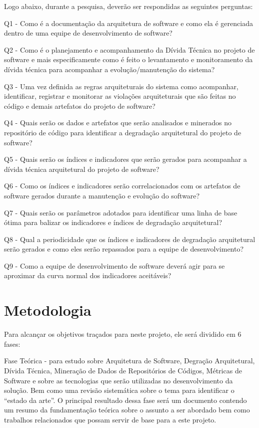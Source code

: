 \documentclass[
	12pt,				%
	openright,			%
	twoside,			%
	a4paper,			%
	english,			%
	french,				%
	spanish,			%
	brazil,				%
	]{abntex2}
\begin{document}

Logo abaixo, durante a pesquisa, deverão ser respondidas as seguintes
perguntas:

Q1 - Como é a documentação da arquitetura de software e como ela é
gerenciada dentro de uma equipe de desenvolvimento de software?

Q2 - Como é o planejamento e acompanhamento da Dívida Técnica no projeto
de software e mais especificamente como é feito o levantamento e monitoramento
da dívida técnica para acompanhar a evolução/manutenção do sistema?

Q3 - Uma vez definida as regras arquiteturais do sistema como acompanhar,
identificar, registrar e monitorar as violações arquiteturais que
são feitas no código e demais artefatos do projeto de software? 

Q4 - Quais serão os dados e artefatos que serão analisados e minerados
no repositório de código para identificar a degradação arquitetural
do projeto de software?

Q5 - Quais serão os índices e indicadores que serão gerados para acompanhar
a dívida técnica arquitetural do projeto de software?

Q6 - Como os índices e indicadores serão correlacionados com os artefatos
de software gerados durante a manutenção e evolução do software?

Q7 - Quais serão os parâmetros adotados para identificar uma linha
de base ótima para balizar os indicadores e índices de degradação
arquitetural?

Q8 - Qual a periodicidade que os índices e indicadores de degradação
arquitetural serão gerados e como eles serão repassados para a equipe
de desenvolvimento?

Q9 - Como a equipe de desenvolvimento de software deverá agir para
se aproximar da curva normal dos indicadores aceitáveis?

\chapter{Metodologia}

Para alcançar os objetivos traçados para neste projeto, ele será dividido
em 6 fases: 

Fase Teórica - para estudo sobre Arquitetura de Software, Degração
Arquitetural, Dívida Técnica, Mineração de Dados de Repositórios de
Códigos, Métricas de Software e sobre as tecnologias que serão utilizadas
no desenvolvimento da solução. Bem como uma revisão sistemática sobre
o tema para identificar o \textquotedblleft estado da arte\textquotedblright .
O principal resultado dessa fase será um documento contendo um resumo
da fundamentação teórica sobre o assunto a ser abordado bem como trabalhos
relacionados que possam servir de base para a este projeto. 
\end{document}

